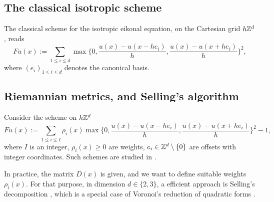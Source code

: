\subsection{The classical isotropic scheme}

The classical scheme for the isotropic eikonal equation, on the Cartesian grid $h\mathbb{Z}^d$, reads 
\begin{equation}
	Fu(x) := \sum_{1 \leq i \leq d} \max \{0, \frac{u(x)-u(x-h e_i)} h, \frac{u(x)-u(x+h e_i)} h\}^2,
\end{equation}
where $(e_i)_{1 \leq i \leq d}$ denotes the canonical basis. 







\subsection{Riemannian metrics, and Selling's algorithm}

Consider the scheme on $h\mathbb{Z}^d$
\begin{equation}
Fu(x) := \sum_{1 \leq i \leq I} \rho_i(x)  \max\{0, \frac{u(x)-u(x-h e_i)} h, \frac{u(x)-u(x+h e_i)} h\}^2 - 1,
\end{equation}
where $I$ is an integer, $\rho_i(x) \geq 0$ are weights, $e_i\in \mathbb{Z}^d \setminus \{0\}$ are offsets with integer coordinates. Such schemes are studied in \cite{mirebeau2019riemannian}.





In practice, the matrix $D(x)$ is given, and we want to define suitable weights $\rho_i(x)$.
For that purpose, in dimension $d \in \{2,3\}$, a efficient approach is Selling's decomposition \cite{Selling:1874Algorithm,Conway1992ThreeDimensional}, which is a special case of Voronoi's reduction of quadratic forms \cite{Schurmann2009ComputationalQuadratic}.



